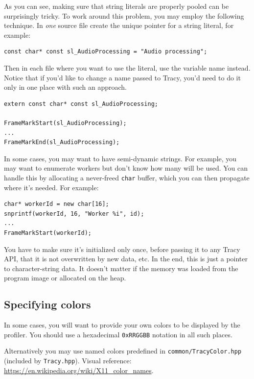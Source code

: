 \documentclass[hidelinks,titlepage,a4paper]{article}
\begin{document}
As you can see, making sure that string literals are properly pooled can be surprisingly tricky. To work around this problem, you may employ the following technique. In \emph{one} source file create the unique pointer for a string literal, for example:

\begin{lstlisting}
const char* const sl_AudioProcessing = "Audio processing";
\end{lstlisting}

Then in each file where you want to use the literal, use the variable name instead. Notice that if you'd like to change a name passed to Tracy, you'd need to do it only in one place with such an approach.

\begin{lstlisting}
extern const char* const sl_AudioProcessing;

FrameMarkStart(sl_AudioProcessing);
...
FrameMarkEnd(sl_AudioProcessing);
\end{lstlisting}

In some cases, you may want to have semi-dynamic strings. For example, you may want to enumerate workers but don't know how many will be used. You can handle this by allocating a never-freed \texttt{char} buffer, which you can then propagate where it's needed. For example:

\begin{lstlisting}
char* workerId = new char[16];
snprintf(workerId, 16, "Worker %i", id);
...
FrameMarkStart(workerId);
\end{lstlisting}

You have to make sure it's initialized only once, before passing it to any Tracy API, that it is not overwritten by new data, etc. In the end, this is just a pointer to character-string data. It doesn't matter if the memory was loaded from the program image or allocated on the heap.

\subsection{Specifying colors}

In some cases, you will want to provide your own colors to be displayed by the profiler. You should use a hexadecimal \texttt{0xRRGGBB} notation in all such places.

Alternatively you may use named colors predefined in \texttt{common/TracyColor.hpp} (included by \texttt{Tracy.hpp}). Visual reference: \url{https://en.wikipedia.org/wiki/X11_color_names}.
\end{document}
